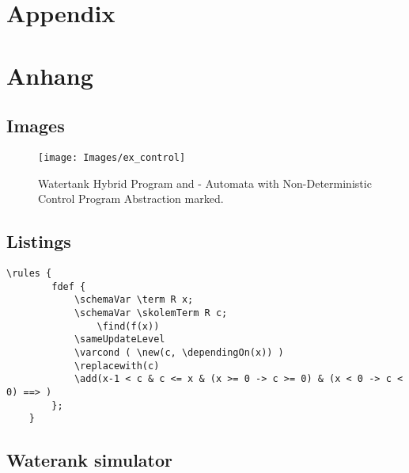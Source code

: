 

{\chapter{Appendix}}    %
{\chapter{Anhang}}      %
\label{chap:appendix}


\section{Images}
	\begin{figure}
		\centering
		\texttt{[image: Images/ex\_control]}
		\caption{Watertank Hybrid Program and - Automata with Non-Deterministic Control Program Abstraction marked.}
		\label{fig:ex_control}
	\end{figure}


\section{Listings}

\begin{lstlisting}[label=app:lst:ruleF]
	\rules {
 	 	fdef {
			\schemaVar \term R x;
			\schemaVar \skolemTerm R c;
    			\find(f(x))
			\sameUpdateLevel
			\varcond ( \new(c, \dependingOn(x)) )
			\replacewith(c)
			\add(x-1 < c & c <= x & (x >= 0 -> c >= 0) & (x < 0 -> c < 0) ==> )
		};
	}	
\end{lstlisting}

\section{Waterank simulator}